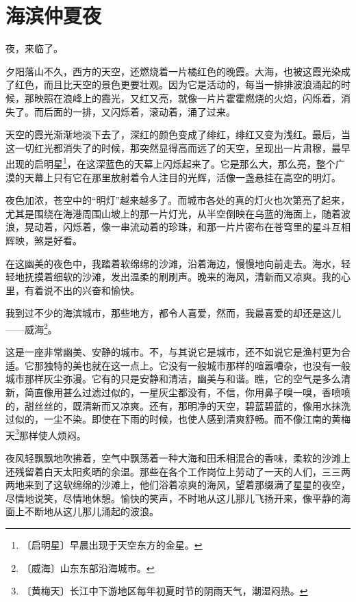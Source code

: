 \documentclass[12pt,UTF-8,openany]{ctexbook}
\begin{document}
\chapter{海滨仲夏夜}

\begin{large}
    
    夜，来临了。
    
    夕阳落山不久，西方的天空，还燃烧着一片橘红色的晚霞。大海，也被这霞光染成了红色，而且比天空的景色更要壮观。因为它是活动的，每当一排排波浪涌起的时候，那映照在浪峰上的霞光，又红又亮，就像一片片霍霍燃烧的火焰，闪烁着，消失了。而后面的一排，又闪烁着，滚动着，涌了过来。
    
    天空的霞光渐渐地淡下去了，深红的颜色变成了绯红，绯红又变为浅红。最后，当这一切红光都消失了的时候，那突然显得高而远了的天空，呈现出一片肃穆，最早出现的启明星\footnote{〔启明星〕早晨出现于天空东方的金星。}，在这深蓝色的天幕上闪烁起来了。它是那么大，那么亮，整个广漠的天幕上只有它在那里放射着令人注目的光辉，活像一盏悬挂在高空的明灯。
    
    夜色加浓，苍空中的“明灯”越来越多了。而城市各处的真的灯火也次第亮了起来，尤其是围绕在海港周围山坡上的那一片灯光，从半空倒映在乌蓝的海面上，随着波浪，晃动着，闪烁着，像一串流动着的珍珠，和那一片片密布在苍穹里的星斗互相辉映，煞是好看。
    
    在这幽美的夜色中，我踏着软绵绵的沙滩，沿着海边，慢慢地向前走去。海水，轻轻地抚摸着细软的沙滩，发出温柔的刷刷声。晚来的海风，清新而又凉爽。我的心里，有着说不出的兴奋和愉快。
    
    我到过不少的海滨城市，那些地方，都令人喜爱，然而，我最喜爱的却还是这儿——威海\footnote{〔威海〕山东东部沿海城市。}。
    
    这是一座非常幽美、安静的城市。不，与其说它是城市，还不如说它是渔村更为合适。它那独特的美也就在这一点上。它没有一般城市那样的喧嚣嘈杂，也没有一般城市那样灰尘弥漫。它有的只是安静和清洁，幽美与和谐。瞧，它的空气是多么清新，简直像用甚么过滤过似的，一星灰尘都没有，不信，你用鼻子嗅一嗅，香喷喷的，甜丝丝的，既清新而又凉爽。还有，那明净的天空，碧蓝碧蓝的，像用水抹洗过似的，一尘不染。即使在下雨的时候，也使人感到清爽舒畅。而不像江南的黄梅天\footnote{〔黄梅天〕长江中下游地区每年初夏时节的阴雨天气，潮湿闷热。}那样使人烦闷。
    
    夜风轻飘飘地吹拂着，空气中飘荡着一种大海和田禾相混合的香味，柔软的沙滩上还残留着白天太阳炙晒的余温。那些在各个工作岗位上劳动了一天的人们，三三两两地来到了这软绵绵的沙滩上，他们浴着凉爽的海风，望着那缀满了星星的夜空，尽情地说笑，尽情地休憩。愉快的笑声，不时地从这儿那儿飞扬开来，像平静的海面上不断地从这儿那儿涌起的波浪。
    

\end{large}
\end{document}
